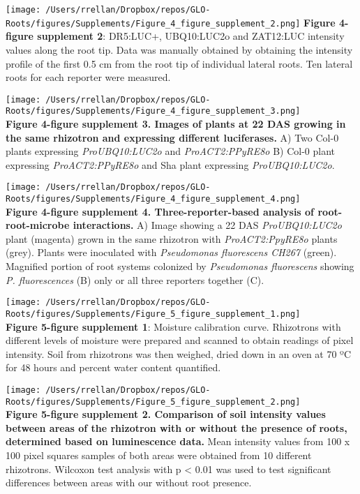 \documentclass[]{article}
\begin{document}
\texttt{[image: /Users/rrellan/Dropbox/repos/GLO-Roots/figures/Supplements/Figure\_4\_figure\_supplement\_2.png]}
\textbf{Figure 4-figure supplement 2}: DR5:LUC+, UBQ10:LUC2o and
ZAT12:LUC intensity values along the root tip. Data was manually
obtained by obtaining the intensity profile of the first 0.5 cm from the
root tip of individual lateral roots. Ten lateral roots for each
reporter were measured.\\\pagebreak

\texttt{[image: /Users/rrellan/Dropbox/repos/GLO-Roots/figures/Supplements/Figure\_4\_figure\_supplement\_3.png]}\\\textbf{Figure
4-figure supplement 3. Images of plants at 22 DAS growing in the same
rhizotron and expressing different luciferases.} A) Two Col-0 plants
expressing \emph{ProUBQ10:LUC2o} and \emph{ProACT2:PPyRE8o} B) Col-0
plant expressing \emph{ProACT2:PPyRE8o} and Sha plant expressing
\emph{ProUBQ10:LUC2o}.\\\pagebreak

\texttt{[image: /Users/rrellan/Dropbox/repos/GLO-Roots/figures/Supplements/Figure\_4\_figure\_supplement\_4.png]}\\\textbf{Figure
4-figure supplement 4. Three-reporter-based analysis of
root-root-microbe interactions.} A) Image showing a 22 DAS
\emph{ProUBQ10:LUC2o} plant (magenta) grown in the same rhizotron with
\emph{ProACT2:PpyRE8o} plants (grey). Plants were inoculated with
\emph{Pseudomonas fluorescens CH267} (green). Magnified portion of root
systems colonized by \emph{Pseudomonas fluorescens} showing \emph{P.
fluorescences} (B) only or all three reporters together (C).\\\pagebreak

\texttt{[image: /Users/rrellan/Dropbox/repos/GLO-Roots/figures/Supplements/Figure\_5\_figure\_supplement\_1.png]}\\\textbf{Figure
5-figure supplement 1}: Moisture calibration curve. Rhizotrons with
different levels of moisture were prepared and scanned to obtain
readings of pixel intensity. Soil from rhizotrons was then weighed,
dried down in an oven at 70 ºC for 48 hours and percent water content
quantified.\\\pagebreak

\texttt{[image: /Users/rrellan/Dropbox/repos/GLO-Roots/figures/Supplements/Figure\_5\_figure\_supplement\_2.png]}\\\textbf{Figure
5-figure supplement 2. Comparison of soil intensity values between areas
of the rhizotron with or without the presence of roots, determined based
on luminescence data.} Mean intensity values from 100 x 100 pixel
squares samples of both areas were obtained from 10 different
rhizotrons. Wilcoxon test analysis with p \textless{} 0.01 was used to
test significant differences between areas with our without root
presence.\\\pagebreak
\end{document}
